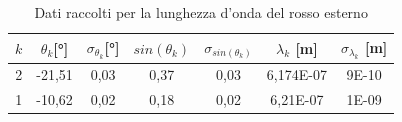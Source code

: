 \documentclass{article}
\begin{document}
        \begin{table}[H]

            \centering

            \begin{tabular}{c c c c c c c}

                \toprule 
                $k$ & $\theta_k$[°] & $\sigma_{\theta_k}$[°] & $sin(\theta_k)$ & $\sigma_{sin(\theta_k)}$ & $\lambda_k$ [m] & $\sigma_{\lambda_k}$ [m] \\
                
                \midrule
                2	&	-21,51	&	0,03	&	0,37	&	0,03	&	6,174E-07	&	9E-10\\
                1	&	-10,62	&	0,02	&	0,18	&	0,02	&	6,21E-07	&	1E-09\\
                \bottomrule

            \end{tabular}

            \caption{Dati raccolti per la lunghezza d'onda del rosso esterno}
            
        \end{table}
        \label{table:rosso est}
\end{document}
